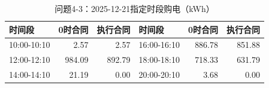 \begin{table}[H]\centering\small\caption{问题4-3：2025-12-21指定时段购电（kWh）}\label{tab:q4_320251221p}
\begin{tabular}{lrrlrr}\toprule
时间段 & 0时合同 & 执行合同 & 时间段 & 0时合同 & 执行合同\\\midrule
10:00-10:10 & 2.57 & 2.57 & 16:00-16:10 & 886.78 & 851.88\\
12:00-12:10 & 984.09 & 892.79 & 18:00-18:10 & 718.33 & 631.79\\
14:00-14:10 & 21.19 & 0.00 & 20:00-20:10 & 3.68 & 0.00\\
\bottomrule\end{tabular}\end{table}
